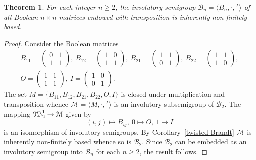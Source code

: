 \documentclass[11pt,reqno]{amsart}
\numberwithin{equation}{section}
\newtheorem{Thm}{Theorem}[section]
\theoremstyle{remark}
\def\cal{\mathcal}
\def\Bc{{\cal B}}
\def\TB{\ensuremath{\mathcal{T\kern-1pt B}_2^1}}
\begin{document}
\begin{Thm}
\label{Theorem 3.7} For each integer $n\ge 2$, the involutory
semigroup $\Bc_n=\langle B_n,\cdot,{}^T\rangle$ of all Boolean
$n\times n$-matrices endowed with transposition is inherently
non-finitely based.
\end{Thm}

\begin{proof} Consider the Boolean matrices
\begin{gather*}
B_{11}=\begin{pmatrix} 0&1\\1&1\end{pmatrix},\
B_{12}=\begin{pmatrix} 1&0\\1&1 \end{pmatrix},\
B_{21}=\begin{pmatrix} 1&1\\0&1 \end{pmatrix},\
B_{22}=\begin{pmatrix} 1&1\\1&0\end{pmatrix},\\
O=\begin{pmatrix} 1&1\\1&1 \end{pmatrix},\
I=\begin{pmatrix}1&0\\0&1 \end{pmatrix}.
\end{gather*}
The set $M=\{B_{11}, B_{12}, B_{21}, B_{22},O,I\}$ is closed under
multiplication and transposition whence $\mathcal{M}=\langle
M,\cdot,{}^T\rangle$ is an involutory subsemigroup of $\Bc_2$. The
mapping $\TB\to \mathcal{M}$ given by
$$ (i,j)\mapsto B_{ij},\ 0\mapsto O,\ 1\mapsto I$$
is an isomorphism of involutory semigroups. By
Corollary~\ref{twisted Brandt} $\mathcal{M}$ is inherently
non-finitely based whence so is $\Bc_2$. Since $\Bc_2$ can be
embedded as an involutory semigroup into $\Bc_n$ for each $n\ge 2$,
the result follows.
\end{proof}
\end{document}
